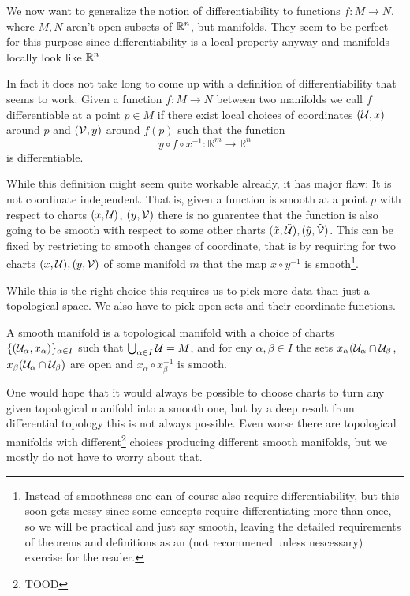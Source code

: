 We now want to generalize the notion of differentiability to functions $f: M \to N$,
where $M, N$ aren't open subsets of $\mathbb{R}^n$, but manifolds. They seem to be perfect
for this purpose since differentiability is a local property anyway and manifolds
locally look like $\mathbb{R}^n$. 

In fact it does not take long to come up with a definition of differentiability that
seems to work: Given a function $f: M \to N$ between two manifolds we call $f$
differentiable at a point $p \in M$ if there exist local choices of coordinates
$(\mathcal{U}, x)$ around $p$ and $(\mathcal{V}, y)$ around $f(p)$ such that the function
\[
	y \circ f \circ x^{-1}: \mathbb{R}^m \to \mathbb{R}^n
\]
is differentiable. 
 
While this definition might seem quite workable already, it has major flaw:
It is not coordinate independent. That is, given a function is smooth at a
point $p$ with respect to charts $(x, \mathcal{U})$, $(y, \mathcal{V})$ there is no guarentee that the function is also going to be
smooth with respect to some other charts $(\tilde{x}, \tilde{\mathcal{U}}), (\tilde{y}, \tilde{\mathcal{V}})$. This can be fixed by
restricting to smooth changes of coordinate, that is by requiring for two charts $(x, \mathcal{U}), (y, \mathcal{V})$ of some manifold
$m$ that the map $x \circ y^{-1}$ is smooth\footnote{
	Instead of smoothness one can of course also require differentiability,
	but this soon gets messy since some concepts require differentiating more
	than once, so we will be practical and just say smooth, leaving the
	detailed requirements of theorems and definitions as an (not recommened
	unless nescessary) exercise for the reader.
}.

While this is the right choice this requires us to pick more data than just a topological space. We also have to pick
open sets and their coordinate functions.

\begin{definition}
A smooth manifold is a topological manifold with a choice of charts
$\{(\mathcal{U}_\alpha, x_\alpha)\}_{\alpha \in I}$ such that $\bigcup_{\alpha \in I} \mathcal{U} = M$,
and for eny $\alpha, \beta \in I$ the sets $x_\alpha(\mathcal{U}_\alpha \cap \mathcal{U}_\beta$,
$x_\beta(\mathcal{U}_\alpha \cap \mathcal{U}_\beta)$ are open and $x_\alpha \circ x_\beta^{-1}$
is smooth.
\end{definition}
One would hope that it would always be possible to choose charts to turn any given
topological manifold into a smooth one, but by a deep result from differential topology 
this is not always possible. Even worse there are topological manifolds with 
different\footnote{TOOD} choices producing different smooth manifolds, but we mostly
do not have to worry about that.

